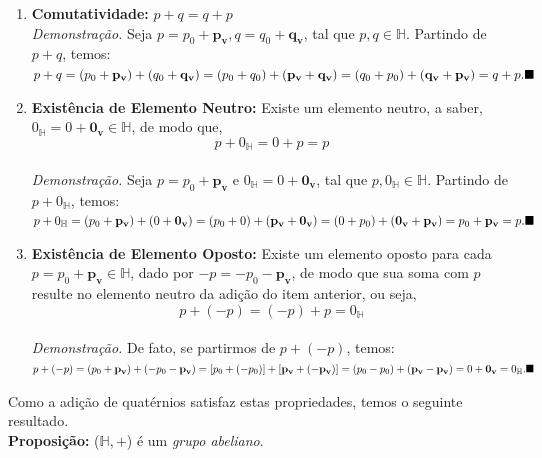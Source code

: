 \documentclass[a4paper,12pt]{article}
\begin{document}
\begin{itemize}
\begin{enumerate}
			\\ \item \textbf{Comutatividade:} $p+q=q+p$
			\\ \newline \textit{Demonstração.} Seja $p=p_0+\mathbf{p_v}, q=q_0+\mathbf{q_v}$,\,\,tal que $p,q \in \mathbb{H}$. Partindo de $p+q$, temos:
			\\ \newline $p+q=(p_0+\mathbf{p_v})+(q_0+\mathbf{q_v})=(p_0+q_0)+(\mathbf{p_v}+\mathbf{q_v})=(q_0+p_0)+(\mathbf{q_v}+\mathbf{p_v})=q+p.\hfill\blacksquare$
			\\ \item \textbf{Existência de Elemento Neutro:} Existe um elemento neutro, a saber, $0_{\mathbb{H}}=0+\mathbf{0_v} \in \mathbb{H}$, de modo que,
			\begin{equation}
			p+0_{\mathbb{H}}=0+p=p
			\end{equation}
			\\ \textit{Demonstração.}  Seja $p=p_0+\mathbf{p_v} \textrm{ e } 0_{\mathbb{H}}=0+\mathbf{0_v}$,\,\,tal que $p,0_{\mathbb{H}} \in \mathbb{H}$. Partindo de $p+0_{\mathbb{H}}$, temos:
			\\ \newline $p+0_{\mathbb{H}}=(p_0+\mathbf{p_v})+(0+\mathbf{0_v})=(p_0+0)+(\mathbf{p_v}+\mathbf{0_v})=(0+p_0)+(\mathbf{0_v}+\mathbf{p_v})=p_0+\mathbf{p_v}=p.\hfill\blacksquare$
			\\ \item \textbf{Existência de Elemento Oposto:} Existe um elemento oposto para cada $p=p_0+\mathbf{p_v} \in \mathbb{H}$, dado por $-p=-p_0-\mathbf{p_v}$, de modo que sua soma com $p$ resulte no elemento neutro da adição do item anterior, ou seja,
			\begin{equation}
			p+(-p)=(-p)+p=0_{\mathbb{H}}
			\end{equation}
			\\ \textit{Demonstração.} De fato, se partirmos de $p+(-p)$, temos:
			\\ \newline $p+(-p)= (p_0+\mathbf{p_v})+(-p_0-\mathbf{p_v})=[p_0+(-p_0)]+[\mathbf{p_v}+(\mathbf{-p_v})]=(p_0-p_0)+(\mathbf{p_v}-\mathbf{p_v})=0+\mathbf{0_v}=0_{\mathbb{H}}.\hfill\blacksquare$
		\end{enumerate}
		Como a adição de quatérnios satisfaz estas propriedades, temos o seguinte resultado.
		\\ \newline \textbf{Proposição: } ($\mathbb{H},+$) é um \textit{grupo abeliano}.
		\\
		

\end{itemize}
\end{document}
